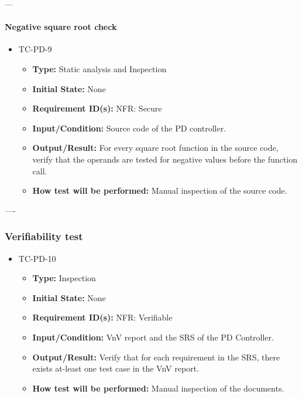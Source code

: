 \documentclass[12pt, titlepage]{article}
\begin{document}
---

\paragraph{Negative square root check}
\begin{itemize}
\item{TC-PD-9\\}
\begin{itemize}
\item{\textbf{Type:}} Static analysis and Inspection
					
\item{\textbf{Initial State:}} None

\item{\textbf{Requirement ID(s):}}  NFR: Secure
					
\item{\textbf{Input/Condition:}}  Source code of the PD controller.
					
\item{\textbf{Output/Result:}} For every square root function in the source code,
verify that the operands are tested for negative values before the function call.

\item{\textbf{How test will be performed:}}  Manual inspection of the source code.
\end{itemize}
\end{itemize}

----

\subsubsection{Verifiability test}

\begin{itemize}
\item{TC-PD-10\\}
\begin{itemize}
\item{\textbf{Type:}} Inspection
					
\item{\textbf{Initial State:}} None

\item{\textbf{Requirement ID(s):}} NFR: Verifiable
					
\item{\textbf{Input/Condition:}} VnV report and the SRS of the PD Controller.
					
\item{\textbf{Output/Result:}} Verify that for each requirement in the SRS, there
exists at-least one test case in the VnV report.
 
\item{\textbf{How test will be performed:}} Manual inspection of the documents.
\end{itemize}
\end{itemize}
\end{document}
